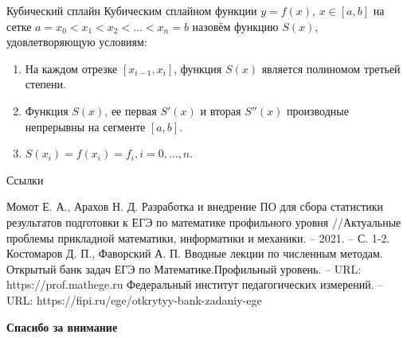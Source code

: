 \documentclass[aspectratio=169]{beamer}
\begin{document}
\begin{frame}{Кубический сплайн}
    Кубическим сплайном функции $y = f(x)$, $x\in[a, b]$ на сетке $a=x_0<x_1<x_2< \dots <x_n=b$ назовём функцию $S(x)$, удовлетворяющую условиям:
    \begin{enumerate}
        \item На каждом отрезке $[x_{i-1},x_i]$, функция $S(x)$ является полиномом третьей степени.
        \item Функция $S(x)$, ее первая $S'(x)$ и вторая $S''(x)$ производные непрерывны на сегменте $[a, b]$.
        \item $S(x_i)=f(x_i)=f_i, i=0,\dots,n$.
\end{enumerate}
\end{frame}   

\begin{frame}{Ссылки}
    \begin{thebibliography}{10}
         Момот Е. А., Арахов Н. Д. Разработка и внедрение ПО для сбора статистики результатов подготовки к ЕГЭ по математике профильного уровня //Актуальные проблемы прикладной математики, информатики и механики. – 2021. – С. 1-2.
        Костомаров Д. П., Фаворский А. П. Вводные лекции по численным методам.
        Открытый банк задач ЕГЭ по Математике.Профильный уровень. – URL:  https://prof.mathege.ru
        Федеральный институт педагогических измерений. – URL:  https://fipi.ru/ege/otkrytyy-bank-zadaniy-ege
        
    \end{thebibliography}
\end{frame}

\begin{frame}
    \center\Large\textcolor{NordBrightBlue}{\textbf{Спасибо за внимание}}\\
\end{frame}
\end{document}
